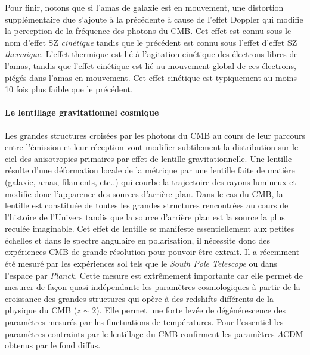 Pour finir, notons que si l'amas de galaxie est en mouvement, une distortion supplémentaire due s'ajoute à la précédente à cause de l'effet Doppler qui modifie la perception de la fréquence des photons du CMB. Cet effet est connu sous le nom d'effet SZ \textit{cinétique} tandis que le précédent est connu sous l'effet d'effet SZ \textit{thermique}. L'effet thermique est lié à l'agitation cinétique des électrons libres de l'amas, tandis que l'effet cinétique est lié au mouvement global de ces électrons, piégés dans l'amas en mouvement. Cet effet cinétique est typiquement au moins 10 fois plus faible que le précédent.


\paragraph{Le lentillage gravitationnel cosmique}
Les grandes structures croisées par les photons du CMB au cours de leur parcours entre l'émission et leur réception vont modifier subtilement la distribution sur le ciel des anisotropies primaires par effet de lentille gravitationnelle. Une lentille résulte d'une déformation locale de la métrique par une lentille faite de matière (galaxie, amas, filaments, etc..) qui courbe la trajectoire des rayons lumineux et modifie donc l'apparence des sources d'arrière plan. Dans le cas du CMB, la lentille est constituée de toutes les grandes structures rencontrées au cours de l'histoire de l'Univers tandis que la source d'arrière plan est la source la plus reculée imaginable. Cet effet de lentille se manifeste essentiellement aux petites échelles et dans le spectre angulaire en polarisation, il nécessite donc des expériences CMB de grande résolution pour pouvoir être extrait. Il a récemment été mesuré par les expériences sol tels que le \textit{South Pole Telescope} ou dans l'espace par \textit{Planck}. Cette mesure est extrêmement importante car elle permet de mesurer de façon quasi indépendante les paramètres cosmologiques à partir de la croissance des grandes structures qui opère à des redshifts différents de la physique du CMB ($z\sim 2$). Elle permet une forte levée de dégénérescence des paramètres mesurés par les fluctuations de températures. Pour l'essentiel les paramètres contraints par le lentillage du CMB confirment les paramètres $\Lambda$CDM obtenus par le fond diffus.